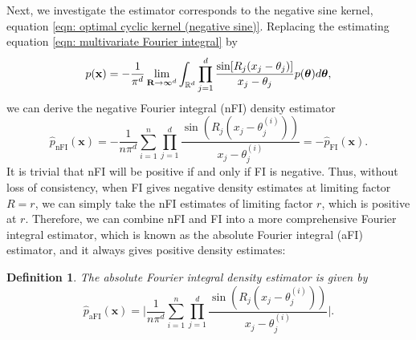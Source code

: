 \documentclass[%
 reprint,
 amsmath,amssymb,
 aps,
]{revtex4-2}
\newtheorem{definition}[theorem]{Definition}
\def\R{\mathbb{R}}
\def\xbold{\mathbf{x}}
\def\Rbold{\mathbf{R}}
\newcommand{\btheta}{\mbox{\boldmath $\theta$}}
\begin{document}
Next, we investigate the estimator corresponds to the negative sine kernel, equation
\eqref{eqn: optimal cyclic kernel (negative sine)}. Replacing the estimating equation \eqref{eqn: multivariate Fourier integral} by
\begin{equation} \label{eqn: negative multivariate Fourier integral}
    p(\xbold) = -\frac{1}{\pi^d} \lim_{\Rbold \to \infty^d} \int_{\R^d} \prod_{j=1}^d \frac{\sin[R_j(x_j-\theta_j)]}{x_j-\theta_j} p(\btheta)d\btheta,
\end{equation}
we can derive the negative Fourier integral (nFI) density estimator
\begin{equation} \label{eqn: multivariate negative Fourier integral density estimator}
    \hat{p}_\text{nFI}(\mathbf{x}) = -\frac{1}{n\pi^d}\sum_{i = 1}^n \prod_{j = 1}^d \frac{\sin(R_j(x_j - \theta_j^{(i)}))}{x_j - \theta_j^{(i)}} = -\hat{p}_\text{FI}(\mathbf{x}).
\end{equation}
It is trivial that nFI will be positive if and only if FI is negative. Thus, without loss of consistency, when FI gives negative density estimates at limiting factor $R=r$, we can simply take the nFI estimates of limiting factor $r$, which is positive at $r$. Therefore, we can combine nFI and FI into a more comprehensive Fourier integral estimator, which is known as the absolute Fourier integral (aFI) estimator, and it always gives positive density estimates:
\begin{definition}
    The absolute Fourier integral density estimator is given by
    \begin{equation} \label{eqn: absolute Fourier integral estimator}
        \hat{p}_\text{aFI}(\mathbf{x}) = \bigg|\frac{1}{n\pi^d}\sum_{i = 1}^n \prod_{j = 1}^d \frac{\sin(R_j(x_j - \theta_j^{(i)}))}{x_j - \theta_j^{(i)}}\bigg|.
    \end{equation}
\end{definition}
\end{document}
